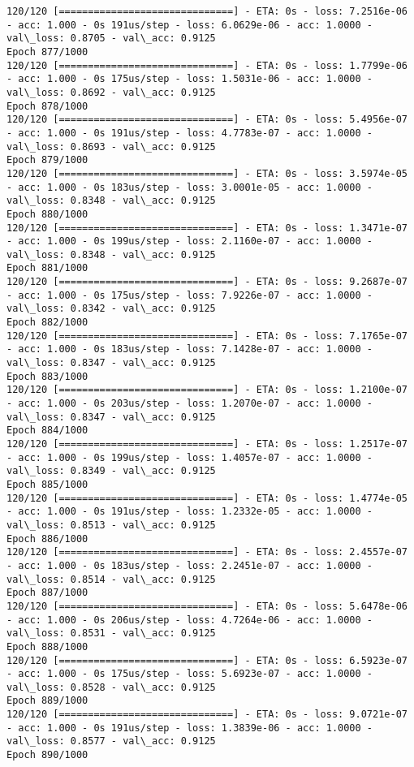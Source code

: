 \documentclass[11pt]{article}
\begin{document}
\begin{Verbatim}[commandchars=\\\{\}]
120/120 [==============================] - ETA: 0s - loss: 7.2516e-06 - acc: 1.000 - 0s 191us/step - loss: 6.0629e-06 - acc: 1.0000 - val\_loss: 0.8705 - val\_acc: 0.9125
Epoch 877/1000
120/120 [==============================] - ETA: 0s - loss: 1.7799e-06 - acc: 1.000 - 0s 175us/step - loss: 1.5031e-06 - acc: 1.0000 - val\_loss: 0.8692 - val\_acc: 0.9125
Epoch 878/1000
120/120 [==============================] - ETA: 0s - loss: 5.4956e-07 - acc: 1.000 - 0s 191us/step - loss: 4.7783e-07 - acc: 1.0000 - val\_loss: 0.8693 - val\_acc: 0.9125
Epoch 879/1000
120/120 [==============================] - ETA: 0s - loss: 3.5974e-05 - acc: 1.000 - 0s 183us/step - loss: 3.0001e-05 - acc: 1.0000 - val\_loss: 0.8348 - val\_acc: 0.9125
Epoch 880/1000
120/120 [==============================] - ETA: 0s - loss: 1.3471e-07 - acc: 1.000 - 0s 199us/step - loss: 2.1160e-07 - acc: 1.0000 - val\_loss: 0.8348 - val\_acc: 0.9125
Epoch 881/1000
120/120 [==============================] - ETA: 0s - loss: 9.2687e-07 - acc: 1.000 - 0s 175us/step - loss: 7.9226e-07 - acc: 1.0000 - val\_loss: 0.8342 - val\_acc: 0.9125
Epoch 882/1000
120/120 [==============================] - ETA: 0s - loss: 7.1765e-07 - acc: 1.000 - 0s 183us/step - loss: 7.1428e-07 - acc: 1.0000 - val\_loss: 0.8347 - val\_acc: 0.9125
Epoch 883/1000
120/120 [==============================] - ETA: 0s - loss: 1.2100e-07 - acc: 1.000 - 0s 203us/step - loss: 1.2070e-07 - acc: 1.0000 - val\_loss: 0.8347 - val\_acc: 0.9125
Epoch 884/1000
120/120 [==============================] - ETA: 0s - loss: 1.2517e-07 - acc: 1.000 - 0s 199us/step - loss: 1.4057e-07 - acc: 1.0000 - val\_loss: 0.8349 - val\_acc: 0.9125
Epoch 885/1000
120/120 [==============================] - ETA: 0s - loss: 1.4774e-05 - acc: 1.000 - 0s 191us/step - loss: 1.2332e-05 - acc: 1.0000 - val\_loss: 0.8513 - val\_acc: 0.9125
Epoch 886/1000
120/120 [==============================] - ETA: 0s - loss: 2.4557e-07 - acc: 1.000 - 0s 183us/step - loss: 2.2451e-07 - acc: 1.0000 - val\_loss: 0.8514 - val\_acc: 0.9125
Epoch 887/1000
120/120 [==============================] - ETA: 0s - loss: 5.6478e-06 - acc: 1.000 - 0s 206us/step - loss: 4.7264e-06 - acc: 1.0000 - val\_loss: 0.8531 - val\_acc: 0.9125
Epoch 888/1000
120/120 [==============================] - ETA: 0s - loss: 6.5923e-07 - acc: 1.000 - 0s 175us/step - loss: 5.6923e-07 - acc: 1.0000 - val\_loss: 0.8528 - val\_acc: 0.9125
Epoch 889/1000
120/120 [==============================] - ETA: 0s - loss: 9.0721e-07 - acc: 1.000 - 0s 191us/step - loss: 1.3839e-06 - acc: 1.0000 - val\_loss: 0.8577 - val\_acc: 0.9125
Epoch 890/1000

\end{Verbatim}
\end{document}
